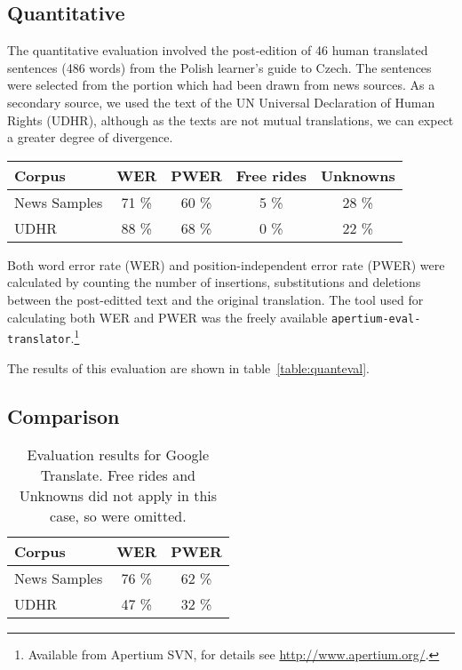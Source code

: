 \documentclass[11pt]{article}
\begin{document}
\subsection{Quantitative}

The quantitative evaluation involved the post-edition of 46 human translated
sentences (486 words) from the Polish learner's guide to Czech. The sentences were selected from 
the portion which had been drawn from news sources. As a secondary source, we 
used the text of the UN Universal Declaration of
Human Rights (UDHR), although as the texts are not mutual translations, we can expect
a greater degree of divergence.

\begin{table*}
\centering
\begin{tabular}{|l|c|c|c|c|}
\hline
Corpus    & WER & PWER & Free rides & Unknowns\\
\hline
News Samples & 71 \% & 60 \%  & 5 \%  & 28 \% \\
UDHR & 88 \% & 68 \%  & 0 \%  & 22 \% \\
\hline
\end{tabular}
    \caption{Evaluation results for the assimilation task. Free rides are those words which
       are identical in both the source and target language. Thus although they do not cause
       a degradation in translation quality, it is relevant to take them into account when
       evaluating the system. Unknown words are included as an indication of naïve coverage
       over the test sets.}
    \label{table:quanteval}
\end{table*}

Both word error rate (WER) and position-independent error rate (PWER) were 
calculated by counting the number of insertions, substitutions and deletions
between the post-editted text and the original translation. The tool used for
calculating both WER and PWER was the freely available {\tt\small apertium-eval-translator}.\footnote{Available 
from Apertium SVN, for details see {\small \url{http://www.apertium.org/}}.}

The results of this evaluation are shown in table~\ref{table:quanteval}. 

\subsection{Comparison}

\begin{table}
\centering
\begin{tabular}{|l|c|c|}
\hline
Corpus    & WER & PWER \\
\hline
News Samples & 76 \% & 62 \%  \\
UDHR & 47 \% & 32 \% \\
\hline
\end{tabular}
    \caption{Evaluation results for Google Translate. Free rides and Unknowns
    did not apply in this case, so were omitted.}
    \label{table:googlecompar}
\end{table}
\end{document}
